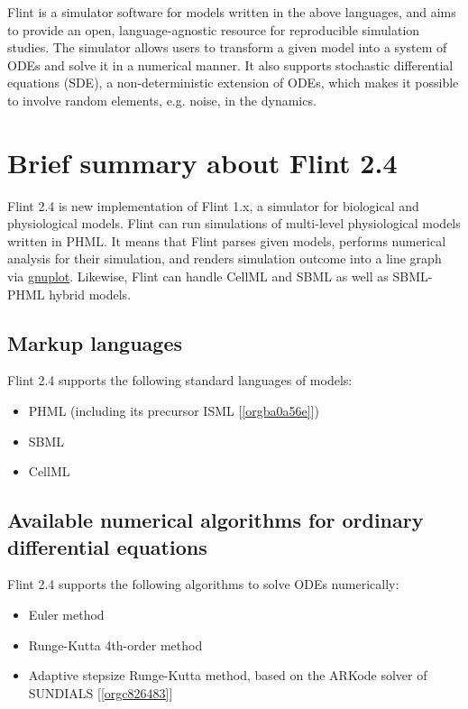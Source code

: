 \documentclass[a4paper,10pt]{report}
\begin{document}
Flint is a simulator software for models written in the above languages, and
aims to provide an open, language-agnostic resource for reproducible simulation
studies. The simulator allows users to transform a given model into a system of
ODEs and solve it in a numerical manner. It also supports stochastic
differential equations (SDE), a non-deterministic extension of ODEs, which makes
it possible to involve random elements, e.g. noise, in the dynamics.

\section{Brief summary about Flint 2.4}
\label{sec:orgb0ff17f}
Flint 2.4 is new implementation of Flint 1.x, a simulator for biological and physiological models.
Flint can run simulations of multi-level physiological models written in PHML.
It means that Flint parses given models, performs numerical analysis for their
simulation, and renders simulation outcome into a line graph via \href{http://www.gnuplot.info/}{gnuplot}.
Likewise, Flint can handle CellML and SBML as well as SBML-PHML hybrid models.

\subsection{Markup languages}
\label{sec:orgd579d1c}
Flint 2.4 supports the following standard languages of models:

\begin{itemize}
\item PHML (including its precursor ISML [\ref{orgba0a56e}])
\item SBML
\item CellML
\end{itemize}

\subsection{Available numerical algorithms for ordinary differential equations}
\label{sec:org570b817}
Flint 2.4 supports the following algorithms to solve ODEs numerically:

\begin{itemize}
\item Euler method
\item Runge-Kutta 4th-order method
\item Adaptive stepsize Runge-Kutta method, based on the ARKode solver of
SUNDIALS [\ref{orgc826483}]
\end{itemize}
\end{document}
